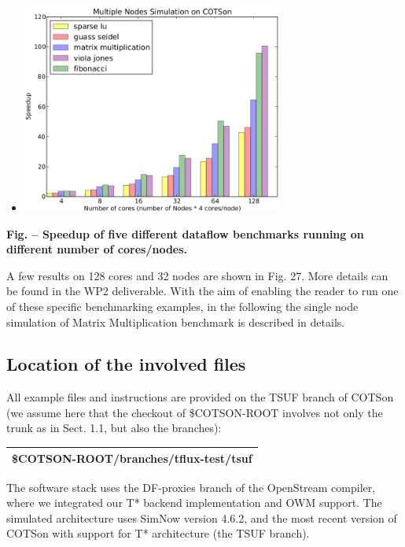 \documentclass[a4paper]{article}
\newcounter{Figure}
\renewcommand\theFigure{\arabic{Figure}}
\begin{document}
\begin{itemize}
\item {\centering 
\includegraphics[width=3.3772in,height=2.7181in]{img43.png}
\par}
\end{itemize}
{\centering{}\sffamily\bfseries
\label{bkm:Ref388222100}Fig.
\stepcounter{Figure}{\theFigure} -- Speedup of five different dataflow
benchmarks running on different number of cores/nodes.
\par}

{
A few results on 128 cores and 32 nodes are shown in Fig. 27. More
details can be found in the WP2 deliverable. With the aim of enabling
the reader to run one of these specific benchmarking examples, in the
following the single node simulation of Matrix Multiplication benchmark
is described in details.}

\subsection[Location of the involved files]{Location of the involved
files}
{
All example files and instructions are provided on the TSUF branch of
COTSon (we assume here that the checkout of \$COTSON-ROOT involves not
only the trunk as in Sect. 1.1, but also the branches):}

\begin{flushleft}
\tablehead{}
\begin{supertabular}{|m{6.34626in}|}
\hline
{}\ttfamily
\$COTSON-ROOT/branches/tflux-test/tsuf\\\hline
\end{supertabular}
\end{flushleft}
{
The software stack uses the DF-proxies branch of the OpenStream
compiler, where we integrated our T* backend implementation and OWM
support. The simulated architecture uses SimNow version 4.6.2, and the
most recent version of COTSon with support for T* architecture (the
TSUF branch). }
\end{document}
